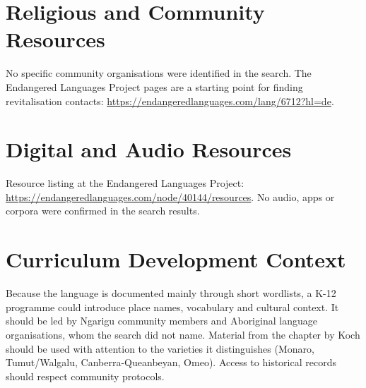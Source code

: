 \documentclass[12pt]{article}
\begin{document}
\section{Religious and Community Resources}
No specific community organisations were identified in the search. The Endangered Languages Project pages are a starting point for finding revitalisation contacts: \url{https://endangeredlanguages.com/lang/6712?hl=de}.

\section{Digital and Audio Resources}
Resource listing at the Endangered Languages Project: \url{https://endangeredlanguages.com/node/40144/resources}. No audio, apps or corpora were confirmed in the search results.

\section{Curriculum Development Context}
Because the language is documented mainly through short wordlists, a K-12 programme could introduce place names, vocabulary and cultural context. It should be led by Ngarigu community members and Aboriginal language organisations, whom the search did not name. Material from the chapter by Koch should be used with attention to the varieties it distinguishes (Monaro, Tumut/Walgalu, Canberra-Queanbeyan, Omeo). Access to historical records should respect community protocols.
\end{document}
